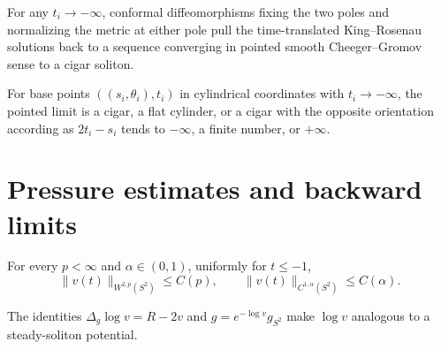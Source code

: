 \begin{lemma}
\label{lem:chow-iv-king-rosenau-pole-cigar-limit}

For any \(t_i\to-\infty\), conformal diffeomorphisms fixing the two poles and
normalizing the metric at either pole pull the time-translated King--Rosenau
solutions back to a sequence converging in pointed smooth Cheeger--Gromov
sense to a cigar soliton.
\end{lemma}

\begin{lemma}
\label{lem:chow-iv-king-rosenau-pointed-limits}

For base points \(((s_i,\theta_i),t_i)\) in cylindrical coordinates with
\(t_i\to-\infty\), the pointed limit is a cigar, a flat cylinder, or a cigar
with the opposite orientation according as \(2t_i-s_i\) tends to
\(-\infty\), a finite number, or \(+\infty\).
\end{lemma}

\section{Pressure estimates and backward limits}

\begin{lemma}
\label{lem:chow-iv-pressure-sobolev-holder}

For every \(p<\infty\) and \(\alpha\in(0,1)\), uniformly for \(t\le-1\),
\[
 \|v(t)\|_{W^{2,p}(S^2)}\le C(p),\qquad
 \|v(t)\|_{C^{1,\alpha}(S^2)}\le C(\alpha).
\]
\end{lemma}

\begin{remark}
\label{rem:chow-iv-pressure-soliton-potential}

The identities \(\Delta_g\log v=R-2v\) and
\(g=e^{-\log v}g_{S^2}\) make \(\log v\) analogous to a steady-soliton
potential.
\end{remark}

